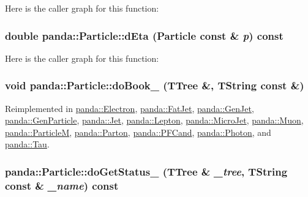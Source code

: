 Here is the caller graph for this function:\hypertarget{classpanda_1_1Particle_a7216a6a830a5231aef8ebc7d57018699}{
\subsubsection[{dEta}]{\setlength{\rightskip}{0pt plus 5cm}double panda::Particle::dEta ({\bf Particle} const \& {\em p}) const}}
\label{classpanda_1_1Particle_a7216a6a830a5231aef8ebc7d57018699}


Here is the caller graph for this function:\hypertarget{classpanda_1_1Particle_a3dab1e8430ed2e287ecd8fdbbdcf3c7e}{
\subsubsection[{doBook\_\-}]{\setlength{\rightskip}{0pt plus 5cm}void panda::Particle::doBook\_\- (TTree \&, \/  TString const \&)}}
\label{classpanda_1_1Particle_a3dab1e8430ed2e287ecd8fdbbdcf3c7e}


Reimplemented in \hyperlink{classpanda_1_1Electron_a2b2000f57a7f009c12bdf33f25d50350}{panda::Electron}, \hyperlink{classpanda_1_1FatJet_a32dbcd6e7cf31c79aed92220c43daed7}{panda::FatJet}, \hyperlink{classpanda_1_1GenJet_a59196025df6d85eb481e9c47c681e0d7}{panda::GenJet}, \hyperlink{classpanda_1_1GenParticle_aae66df460d70150e146dd95392c7e781}{panda::GenParticle}, \hyperlink{classpanda_1_1Jet_a9f7d21237e7933ee156f5edea6a27696}{panda::Jet}, \hyperlink{classpanda_1_1Lepton_af9d74c974117a26f53e60da918cb84ba}{panda::Lepton}, \hyperlink{classpanda_1_1MicroJet_aa1f5281c41c34033e5ef194f9d846413}{panda::MicroJet}, \hyperlink{classpanda_1_1Muon_af27e42e8f6276dcbcf61ac742b17a4cd}{panda::Muon}, \hyperlink{classpanda_1_1ParticleM_a55d6e7e91edbc88e980a0031c299ef18}{panda::ParticleM}, \hyperlink{classpanda_1_1Parton_a6a1af1903a231bc8db97242dda42979a}{panda::Parton}, \hyperlink{classpanda_1_1PFCand_a0e032b321a5b1003d7639b72a211c7be}{panda::PFCand}, \hyperlink{classpanda_1_1Photon_aaa6770e70a128a4e4910899f92fbd816}{panda::Photon}, and \hyperlink{classpanda_1_1Tau_a223ddb7af7f072bdb8973676cdb69004}{panda::Tau}.\hypertarget{classpanda_1_1Particle_a7dcbf68bc3e74fdef1e3f3c620fb019a}{
\subsubsection[{doGetStatus\_\-}]{ panda::Particle::doGetStatus\_\- (TTree \& {\em \_\-tree}, \/  TString const \& {\em \_\-name}) const}}
\label{classpanda_1_1Particle_a7dcbf68bc3e74fdef1e3f3c620fb019a}


